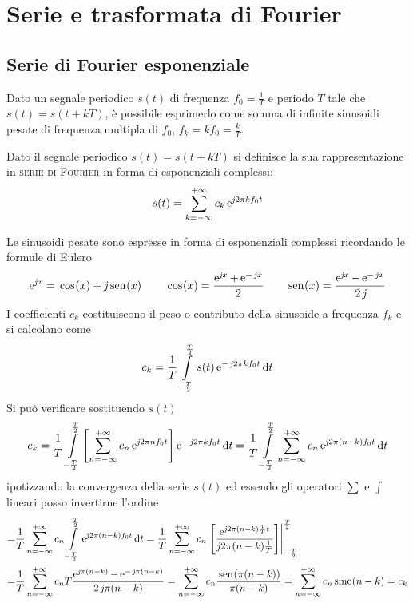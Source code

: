\chapter{Serie e trasformata di Fourier}

\section{Serie di Fourier esponenziale}
Dato un segnale periodico $s(t)$ di frequenza $f_0=\frac{1}{T}$ e periodo $T$ tale che $s(t)=s(t+k T)$, è possibile esprimerlo come somma di infinite sinusoidi pesate di frequenza multipla di $f_0$, $f_k=k f_0=\frac{k}{T}$.

\begin{definizione}
Dato il segnale periodico $s(t)=s(t+k T)$ si definisce la sua rappresentazione in \textsc{serie di Fourier} in forma di esponenziali complessi:
\begin{equation}\label{eq:serie_fourier}\index{serie!di Fourier}
s(t)=\sum_{k=-\infty}^{+\infty} c_k \e{\imath 2\pi k f_0 t}
\end{equation}
\end{definizione}
Le sinusoidi pesate sono espresse in forma di esponenziali complessi ricordando le formule di Eulero
\begin{equation}\e{\imath x}=\cos{x}+\imath\sen{x}\qquad\cos{x}=\frac{\e{\imath x}+\e{-\imath x}}{2}\qquad\sen{x}=\frac{\e{\imath x}-\e{-\imath x}}{2\imath}\end{equation}
I coefficienti $c_k$ costituiscono il peso o contributo della sinusoide a frequenza $f_k$ e si calcolano come
\begin{equation}\label{eq:serie_fourier_coef}\index{serie!di Fourier!coefficienti}
c_k=\frac{1}{T}\intd{-\frac{T}{2}}{\frac{T}{2}}{s(t)\e{-\imath 2\pi k f_0 t}}{t} 
\end{equation}
Si può verificare sostituendo $s(t)$
\[c_k=\frac{1}{T}\int\limits_{-\frac{T}{2}}^{\frac{T}{2}}{ \left[\sum_{n=-\infty}^{+\infty} c_n \operatorname{e}^{\operatorname{\mathit{j}\!} 2\pi n f_0 t}\right] \operatorname{e}^{-\operatorname{\mathit{j}\!} 2\pi k f_0 t}}{\,\mathop{}\!\mathrm{d}{t}} = \frac{1}{T}\int\limits_{-\frac{T}{2}}^{\frac{T}{2}}{ \sum_{n=-\infty}^{+\infty} c_n \operatorname{e}^{\operatorname{\mathit{j}\!} 2\pi (n-k) f_0 t} }{\,\mathop{}\!\mathrm{d}{t}} \]
ipotizzando la convergenza della serie $s(t)$ ed essendo gli operatori $\sum$ e $\int$ lineari posso invertirne l'ordine
\[\begin{split}=&\frac{1}{T}\sum_{n=-\infty}^{+\infty} c_n \intd{-\frac{T}{2}}{\frac{T}{2}}{\e{\imath 2\pi(n-k)f_0 t}}{t}
=\frac{1}{T}\sum_{n=-\infty}^{+\infty} c_n \bound{-\frac{T}{2}}{\frac{T}{2}}{\frac{\e{\imath 2\pi(n-k)\frac{1}{T}t}}{\imath 2\pi(n-k)\frac{1}{T} }}\\
=&\frac{1}{T}\sum_{n=-\infty}^{+\infty} c_n T \frac{\e{\imath \pi(n-k)}-\e{-\imath\pi(n-k)}}{2\imath\pi(n-k)}
=\sum_{n=-\infty}^{+\infty} c_n \frac{\sen{\pi(n-k)}}{\pi(n-k)}
=\sum_{n=-\infty}^{+\infty} c_n \sinc{n-k} = c_k 
\end{split}\]
